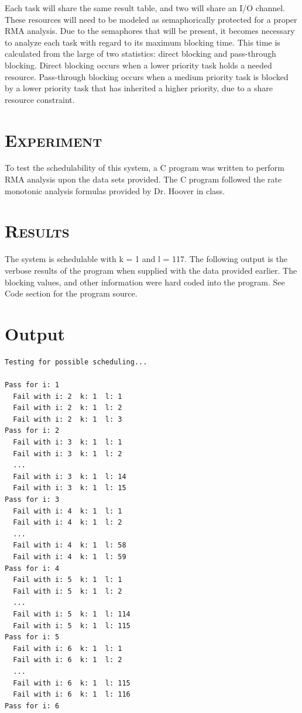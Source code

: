 \documentclass[11pt]{report}
\begin{document}
\begin{spacing}{1.5}
Each task will share the same result table, and two will share an I/O channel.  These resources will need to be modeled as semaphorically protected for a proper RMA analysis.  Due to the semaphores that will be present, it becomes necessary to analyze each task with regard to its maximum blocking time.  This time is calculated from the large of two statistics: direct blocking and pass-through blocking.  Direct blocking occurs when a lower priority task holds a needed resource.  Pass-through blocking occurs when a medium priority task is blocked by a lower priority task that has inherited a higher priority, due to a share resource constraint.

\section*{\scshape Experiment} %
\label{cha:experiment}

To test the schedulability of this system, a C program was written to perform RMA analysis upon the data sets provided.  The C program followed the rate monotonic analysis formulas provided by Dr. Hoover in class.

\section*{\scshape Results} %
\label{cha:results}

The system is schedulable with k = 1 and l = 117.  The following output is the verbose results of the program when supplied with the data provided earlier.  The blocking values, and other information were hard coded into the program. See Code section for the program source.

\section*{Output}
\begin{lstlisting}
Testing for possible scheduling...

Pass for i: 1
  Fail with i: 2  k: 1  l: 1
  Fail with i: 2  k: 1  l: 2
  Fail with i: 2  k: 1  l: 3
Pass for i: 2
  Fail with i: 3  k: 1  l: 1
  Fail with i: 3  k: 1  l: 2
  ...
  Fail with i: 3  k: 1  l: 14
  Fail with i: 3  k: 1  l: 15
Pass for i: 3
  Fail with i: 4  k: 1  l: 1
  Fail with i: 4  k: 1  l: 2
  ...
  Fail with i: 4  k: 1  l: 58
  Fail with i: 4  k: 1  l: 59
Pass for i: 4
  Fail with i: 5  k: 1  l: 1
  Fail with i: 5  k: 1  l: 2
  ...
  Fail with i: 5  k: 1  l: 114
  Fail with i: 5  k: 1  l: 115
Pass for i: 5
  Fail with i: 6  k: 1  l: 1
  Fail with i: 6  k: 1  l: 2
  ...
  Fail with i: 6  k: 1  l: 115
  Fail with i: 6  k: 1  l: 116
Pass for i: 6


\end{lstlisting}
\end{spacing}
\end{document}
